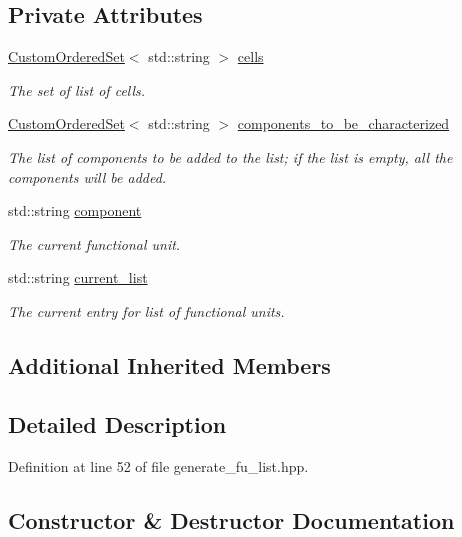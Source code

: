 \subsection*{Private Attributes}
\begin{DoxyCompactItemize}
\item 
\hyperlink{classCustomOrderedSet}{Custom\+Ordered\+Set}$<$ std\+::string $>$ \hyperlink{classGenerateFuList_a3832208eba8658699d0880ee9123159e}{cells}
\begin{DoxyCompactList}\small\item\em The set of list of cells. \end{DoxyCompactList}\item 
\hyperlink{classCustomOrderedSet}{Custom\+Ordered\+Set}$<$ std\+::string $>$ \hyperlink{classGenerateFuList_a4415121177ccfd3e8e386ef0971f6712}{components\+\_\+to\+\_\+be\+\_\+characterized}
\begin{DoxyCompactList}\small\item\em The list of components to be added to the list; if the list is empty, all the components will be added. \end{DoxyCompactList}\item 
std\+::string \hyperlink{classGenerateFuList_aa23b467e895dc2e1402dfbd23193dd1d}{component}
\begin{DoxyCompactList}\small\item\em The current functional unit. \end{DoxyCompactList}\item 
std\+::string \hyperlink{classGenerateFuList_a934ddfe617b1a07a2a87c2ae1c460580}{current\+\_\+list}
\begin{DoxyCompactList}\small\item\em The current entry for list of functional units. \end{DoxyCompactList}\end{DoxyCompactItemize}
\subsection*{Additional Inherited Members}


\subsection{Detailed Description}


Definition at line 52 of file generate\+\_\+fu\+\_\+list.\+hpp.



\subsection{Constructor \& Destructor Documentation}
\mbox{\label{classGenerateFuList_ac027f6e5f51f33b7bb3b673ec414e4f6}} 
